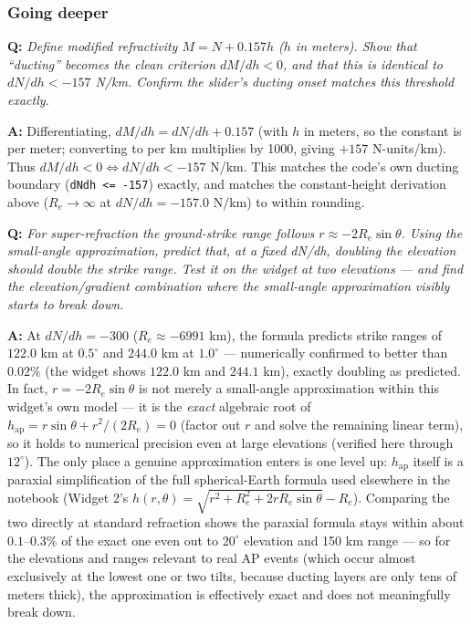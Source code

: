 \documentclass[11pt]{article}
\newenvironment{qa}[1]{\par\noindent\textbf{\color{qgray}Q: }\emph{#1}\par\noindent\textbf{A: }}{\par\vspace{6pt}}
\newcommand{\tier}[1]{\subsubsection*{#1}}
\begin{document}
\tier{Going deeper}
\begin{qa}{Define modified refractivity $M = N + 0.157h$ ($h$ in meters). Show that ``ducting'' becomes the clean criterion $dM/dh<0$, and that this is identical to $dN/dh<-157$ N/km. Confirm the slider's ducting onset matches this threshold exactly.}
Differentiating, $dM/dh = dN/dh + 0.157$ (with $h$ in meters, so the constant is per meter; converting to per km multiplies by 1000, giving $+157$ N-units/km). Thus $dM/dh<0 \iff dN/dh < -157$ N/km. This matches the code's own ducting boundary (\texttt{dNdh <= -157}) exactly, and matches the constant-height derivation above ($R_e\to\infty$ at $dN/dh=-157.0$ N/km) to within rounding.
\end{qa}
\begin{qa}{For super-refraction the ground-strike range follows $r\approx-2R_e\sin\theta$. Using the small-angle approximation, predict that, at a fixed dN/dh, doubling the elevation should double the strike range. Test it on the widget at two elevations --- and find the elevation/gradient combination where the small-angle approximation visibly starts to break down.}
At $dN/dh=-300$ ($R_e\approx-6991$ km), the formula predicts strike ranges of $122.0$ km at $0.5^\circ$ and $244.0$ km at $1.0^\circ$ --- numerically confirmed to better than $0.02\%$ (the widget shows $122.0$ km and $244.1$ km), exactly doubling as predicted. In fact, $r=-2R_e\sin\theta$ is not merely a small-angle approximation within this widget's own model --- it is the \emph{exact} algebraic root of $h_{\mathrm{ap}}=r\sin\theta + r^2/(2R_e)=0$ (factor out $r$ and solve the remaining linear term), so it holds to numerical precision even at large elevations (verified here through $12^\circ$). The only place a genuine approximation enters is one level up: $h_{\mathrm{ap}}$ itself is a paraxial simplification of the full spherical-Earth formula used elsewhere in the notebook (Widget 2's $h(r,\theta)=\sqrt{r^2+R_e^2+2rR_e\sin\theta}-R_e$). Comparing the two directly at standard refraction shows the paraxial formula stays within about $0.1$--$0.3\%$ of the exact one even out to $20^\circ$ elevation and 150 km range --- so for the elevations and ranges relevant to real AP events (which occur almost exclusively at the lowest one or two tilts, because ducting layers are only tens of meters thick), the approximation is effectively exact and does not meaningfully break down.
\end{qa}
\end{document}
